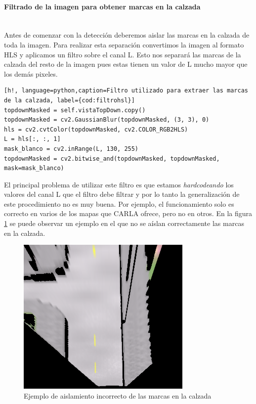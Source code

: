 \paragraph{Filtrado de la imagen para obtener marcas en la calzada}\mbox{}\\
Antes de comenzar con la detección deberemos aislar las marcas en la calzada de toda la imagen.
Para realizar esta separación convertimos la imagen al formato HLS y aplicamos un filtro sobre el canal L. Esto nos separará las marcas de la calzada del resto de la imagen pues estas tienen un valor de L mucho mayor que los demás pixeles.


\begin{lstlisting}[h!, language=python,caption=Filtro utilizado para extraer las marcas de la calzada, label={cod:filtrohsl}]
topdownMasked = self.vistaTopDown.copy()
topdownMasked = cv2.GaussianBlur(topdownMasked, (3, 3), 0)
hls = cv2.cvtColor(topdownMasked, cv2.COLOR_RGB2HLS)
L = hls[:, :, 1]
mask_blanco = cv2.inRange(L, 130, 255)
topdownMasked = cv2.bitwise_and(topdownMasked, topdownMasked, mask=mask_blanco)
\end{lstlisting}

El principal problema de utilizar este filtro es que estamos \textit{hardcodeando} los valores del canal L que el filtro debe filtrar y por lo tanto la generalización de este procedimiento no es muy buena. Por ejemplo, el funcionamiento solo es correcto en varios de los mapas que CARLA ofrece, pero no en otros. En la figura \ref{fig:filtroMalo} se puede observar un ejemplo en el que no se aíslan correctamente las marcas en la calzada.

\begin{figure}[h!]
    \centering
    \includegraphics[width=.6\linewidth]{img/filtromalo.png}
    \caption{Ejemplo de aislamiento incorrecto de las marcas en la calzada}
    \label{fig:filtroMalo}
\end{figure}


